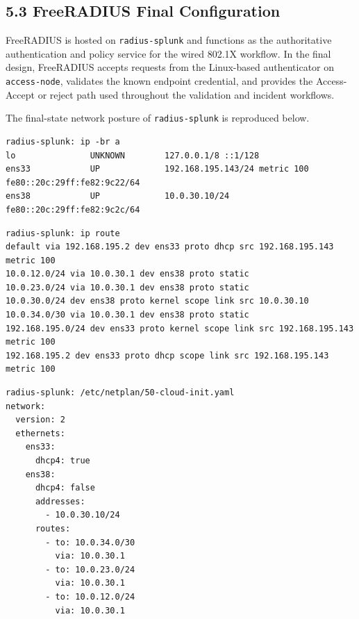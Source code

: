 \documentclass[11pt]{article}
\begin{document}

\subsection{5.3 FreeRADIUS Final Configuration}
\label{sec:freeradius-final-configuration}

FreeRADIUS is hosted on \texttt{radius-splunk} and functions as the authoritative authentication and policy service for the wired 802.1X workflow. In the final design, FreeRADIUS accepts requests from the Linux-based authenticator on \texttt{access-node}, validates the known endpoint credential, and provides the Access-Accept or reject path used throughout the validation and incident workflows.

The final-state network posture of \texttt{radius-splunk} is reproduced below.

\begin{verbatim}
radius-splunk: ip -br a
lo               UNKNOWN        127.0.0.1/8 ::1/128
ens33            UP             192.168.195.143/24 metric 100 fe80::20c:29ff:fe82:9c22/64
ens38            UP             10.0.30.10/24 fe80::20c:29ff:fe82:9c2c/64
\end{verbatim}

\begin{verbatim}
radius-splunk: ip route
default via 192.168.195.2 dev ens33 proto dhcp src 192.168.195.143 metric 100
10.0.12.0/24 via 10.0.30.1 dev ens38 proto static
10.0.23.0/24 via 10.0.30.1 dev ens38 proto static
10.0.30.0/24 dev ens38 proto kernel scope link src 10.0.30.10
10.0.34.0/30 via 10.0.30.1 dev ens38 proto static
192.168.195.0/24 dev ens33 proto kernel scope link src 192.168.195.143 metric 100
192.168.195.2 dev ens33 proto dhcp scope link src 192.168.195.143 metric 100
\end{verbatim}

\begin{verbatim}
radius-splunk: /etc/netplan/50-cloud-init.yaml
network:
  version: 2
  ethernets:
    ens33:
      dhcp4: true
    ens38:
      dhcp4: false
      addresses:
        - 10.0.30.10/24
      routes:
        - to: 10.0.34.0/30
          via: 10.0.30.1
        - to: 10.0.23.0/24
          via: 10.0.30.1
        - to: 10.0.12.0/24
          via: 10.0.30.1
\end{verbatim}
\end{document}
